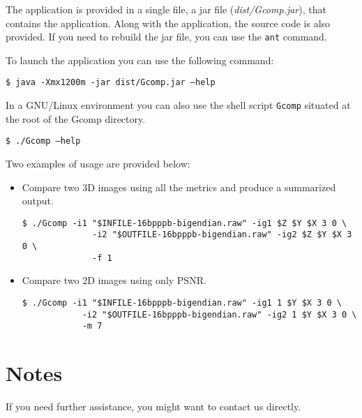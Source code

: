 \documentclass[a4paper,10pt]{article}
\newcommand{\me}{Gcomp\relax }
\begin{document}
The application is provided in a single file, a jar file (\emph{dist/\me{}.jar}), that contains the application.
Along with the application, the source code is also provided. If you need to rebuild the jar file, you can use the \texttt{ant} command.

To launch the application you can use the following command: 

\begin{framed}
\texttt{\$ java -Xmx1200m -jar dist/\me{}.jar --help}
\end{framed}

In a GNU/Linux environment you can also use the shell script \texttt{\me{}} situated at the root of the \me{} directory. 

\begin{framed}
\texttt{\$ ./\me{} --help}
\end{framed}

Two examples of usage are provided below:

\begin{itemize}
\item Compare two 3D images using all the metrics and produce a summarized output.
\begin{framed}%
\vspace{-1em}%
\begin{verbatim}
$ ./Gcomp -i1 "$INFILE-16bpppb-bigendian.raw" -ig1 $Z $Y $X 3 0 \
              -i2 "$OUTFILE-16bpppb-bigendian.raw" -ig2 $Z $Y $X 3 0 \
              -f 1
\end{verbatim}%
\vspace{-1em}%
\end{framed}

\item Compare two 2D images using only PSNR.
\begin{framed}%
\vspace{-1em}%
\begin{verbatim}
$ ./Gcomp -i1 "$INFILE-16bpppb-bigendian.raw" -ig1 1 $Y $X 3 0 \
            -i2 "$OUTFILE-16bpppb-bigendian.raw" -ig2 1 $Y $X 3 0 \
            -m 7
\end{verbatim}%
\vspace{-1em}%
\end{framed}
\end{itemize}

\section{Notes}

If you need further assistance, you might want to contact us directly.



\end{document}
